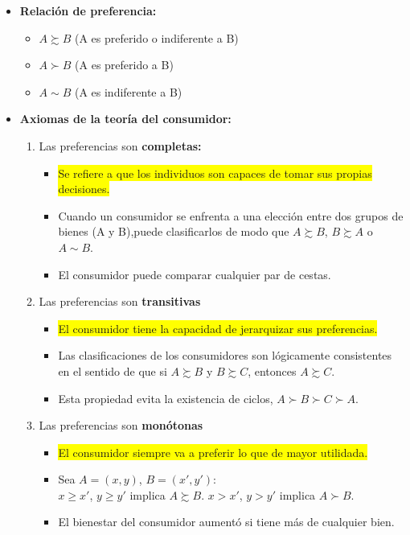 \documentclass{templateNote}
\newcommand{\destacar}[1]{ \colorbox{yellow}{#1}}
\begin{document}
\begin{itemize}
    \item \textbf{Relación de preferencia:}
    \begin{itemize}
        \item $A \succsim B$ (A es preferido o indiferente a B)
        \item $A \succ B$ (A es preferido a B)
        \item $A \sim B$ (A es indiferente a B)
    \end{itemize}

    \item \textbf{Axiomas de la teoría del consumidor:}
    \begin{enumerate}
        \item Las preferencias son \textbf{completas:}
        \begin{itemize}
            \item \destacar{Se refiere a que los individuos son capaces de tomar sus propias decisiones.}
            \item Cuando un consumidor se enfrenta a una elección entre dos grupos de
            bienes (A y B),puede clasificarlos de modo que $A \succsim B$, $B \succsim A$ o $A \sim B$.
            \item El consumidor puede comparar cualquier par de cestas.
        \end{itemize}

        \item Las preferencias son \textbf{transitivas}
        \begin{itemize}
            \item \destacar{El consumidor tiene la capacidad de jerarquizar sus preferencias.}
            \item Las clasificaciones de los consumidores son lógicamente consistentes en
            el sentido de que si $A \succsim B$ y $B \succsim C$, entonces $A \succsim C$.
            \item Esta propiedad evita la existencia de ciclos, $A \succ B \succ C \succ A$.
        \end{itemize}
        \item Las preferencias son \textbf{monótonas}
        \begin{itemize}
            \item \destacar{El consumidor siempre va a preferir lo que de mayor utilidada.}
            \item Sea $A = (x,y)$, $B = (x',y')$: \\
            $x \geq  x'$, $y \geq y'$ implica $A \succsim B$.
            $x >  x'$, $y > y'$ implica $A \succ B$.
            \item El bienestar del consumidor aumentó si tiene más de cualquier bien.
        \end{itemize}


\end{enumerate}
\end{itemize}
\end{document}
